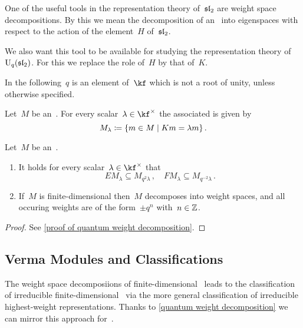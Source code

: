 \documentclass[a4paper, 11pt, oneside]{scrartcl}
\begin{document}
One of the useful tools in the representation theory of~$\mathfrak{sl}_2$ are weight space decompositions.
By this we mean the decomposition of an~ into eigenspaces with respect to the action of the element~$H$ of~$\mathfrak{sl}_2$.

We also want this tool to be available for studying the representation theory of~$\operatorname{U}_q(\mathfrak{sl}_2)$.
For this we replace the role of~$H$ by that of~$K$.

\begin{convention}
  In the following~$q$ is an element of~$\kf$ which is not a root of unity, unless otherwise specified.
\end{convention}

\begin{definition}
  Let~$M$ be an~.
  For every scalar~$\lambda \in \kf^{\times}$ the associated  is given by
  \[
    M_\lambda
    \defined
    \{
      m \in M
    \suchthat
      K m = \lambda m
    \} \,.
  \]
\end{definition}

\begin{theorem}
  \label{quantum weight decomposition}
  Let~$M$ be an~.
  \begin{enumerate}
    \item
      It holds for every scalar~$\lambda \in \kf^{\times}$ that
      \[
        E M_\lambda \subseteq M_{q^2 \lambda} \,,
        \quad
        F M_\lambda \subseteq M_{q^{-2} \lambda} \,.
      \]
    \item
      If~$M$ is finite-dimensional then~$M$ decomposes into weight spaces, and all occuring weights are of the form~$\pm q^n$ with~$n \in \mathbb{Z}$.
  \end{enumerate}
\end{theorem}

\begin{proof}
  See \cref{proof of quantum weight decomposition}.
\end{proof}



\subsection{Verma Modules and Classifications}

The weight space decomposiions of finite-dimensional~ leads to the classification of irreducible finite-dimensional~ via the more general classification of irreducible highest-weight representations.
Thanks to \cref{quantum weight decomposition} we can mirror this approach for~.
\end{document}
